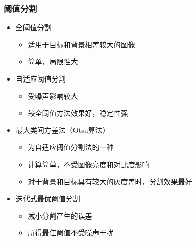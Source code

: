 \documentclass[notheorems,mathserif,table,compress]{beamer}  %
\begin{document}
\begin{frame}
  \frametitle{阈值分割}
  \begin{itemize}
  \item 全阈值分割
       \begin{itemize}
       \item 适用于目标和背景相差较大的图像
       \item 简单，局限性大
       \end{itemize}
  \item 自适应阈值分割
       \begin{itemize}
       \item 受噪声影响较大
       \item 较全阈值方法效果好，稳定性强
       \end{itemize}
  \item 最大类间方差法（Otsu算法）
       \begin{itemize}
       \item 为自适应阈值分割法的一种
       \item 计算简单，不受图像亮度和对比度影响
       \item 对于背景和目标具有较大的灰度差时，分割效果最好
       \end{itemize}
  \item 迭代式最优阈值分割
       \begin{itemize}
       \item 减小分割产生的误差
       \item 所得最佳阈值不受噪声干扰
       \end{itemize}
  \end{itemize}
\end{frame}
\end{document}

